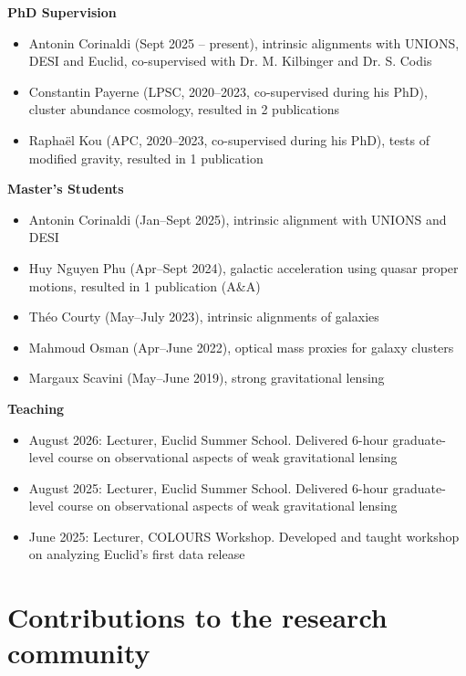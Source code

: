 \documentclass[11pt]{article}
\begin{document}
\textbf{PhD Supervision}
\begin{itemize}[leftmargin=1.5em, itemsep=0.2em]
\item Antonin Corinaldi (Sept 2025 -- present), intrinsic alignments with UNIONS, DESI and Euclid, co-supervised with Dr. M. Kilbinger and Dr. S. Codis
\item Constantin Payerne (LPSC, 2020--2023, co-supervised during his PhD), cluster abundance cosmology, resulted in 2 publications
\item Raphaël Kou (APC, 2020--2023, co-supervised during his PhD), tests of modified gravity, resulted in 1 publication
\end{itemize}

\textbf{Master's Students}
\begin{itemize}[leftmargin=1.5em, itemsep=0.2em]
\item Antonin Corinaldi (Jan--Sept 2025), intrinsic alignment with UNIONS and DESI
\item Huy Nguyen Phu (Apr--Sept 2024), galactic acceleration using quasar proper motions, resulted in 1 publication (A\&A)
\item Théo Courty (May--July 2023), intrinsic alignments of galaxies
\item Mahmoud Osman (Apr--June 2022), optical mass proxies for galaxy clusters
\item Margaux Scavini (May--June 2019), strong gravitational lensing
\end{itemize}

\textbf{Teaching}
\begin{itemize}[leftmargin=1.5em, itemsep=0.2em]
\item August 2026: Lecturer, Euclid Summer School. Delivered 6-hour graduate-level course on observational aspects of weak gravitational lensing
\item August 2025: Lecturer, Euclid Summer School. Delivered 6-hour graduate-level course on observational aspects of weak gravitational lensing
\item June 2025: Lecturer, COLOURS Workshop. Developed and taught workshop on analyzing Euclid's first data release
\end{itemize}

\section*{Contributions to the research community}
\end{document}
